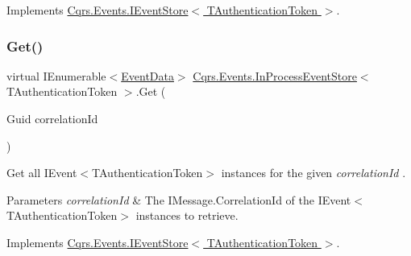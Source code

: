 Implements \hyperlink{interfaceCqrs_1_1Events_1_1IEventStore_ae02ef6c804d0c4a92705a447bc4b2214_ae02ef6c804d0c4a92705a447bc4b2214}{Cqrs.\+Events.\+I\+Event\+Store$<$ T\+Authentication\+Token $>$}.

\mbox{\label{classCqrs_1_1Events_1_1InProcessEventStore_a3d04ebb3354c7a5980b3a7e9586285fc_a3d04ebb3354c7a5980b3a7e9586285fc}} 
\subsubsection{\texorpdfstring{Get()}{Get()}\hspace{0.1cm}{\footnotesize\ttfamily [2/2]}}
{\footnotesize\ttfamily virtual I\+Enumerable$<$\hyperlink{classCqrs_1_1Events_1_1EventData}{Event\+Data}$>$ \hyperlink{classCqrs_1_1Events_1_1InProcessEventStore}{Cqrs.\+Events.\+In\+Process\+Event\+Store}$<$ T\+Authentication\+Token $>$.Get (\begin{DoxyParamCaption}\item[{Guid}]{correlation\+Id }\end{DoxyParamCaption})\hspace{0.3cm}{\ttfamily [virtual]}}



Get all I\+Event$<$\+T\+Authentication\+Token$>$ instances for the given {\itshape correlation\+Id} . 


\begin{DoxyParams}{Parameters}
{\em correlation\+Id} & The I\+Message.\+Correlation\+Id of the I\+Event$<$\+T\+Authentication\+Token$>$ instances to retrieve.\\
\hline
\end{DoxyParams}


Implements \hyperlink{interfaceCqrs_1_1Events_1_1IEventStore_af398bb6768fa661ad97a9fa9ecfbd9fb_af398bb6768fa661ad97a9fa9ecfbd9fb}{Cqrs.\+Events.\+I\+Event\+Store$<$ T\+Authentication\+Token $>$}.

\mbox{\label{classCqrs_1_1Events_1_1InProcessEventStore_ab3df0015ad2f5950f5590f96384009e7_ab3df0015ad2f5950f5590f96384009e7}} 
